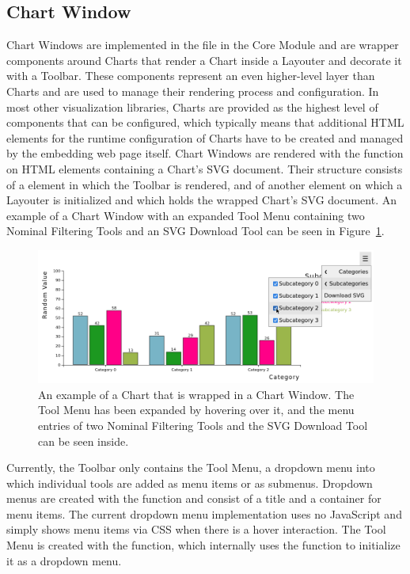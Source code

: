 \subsection{Chart Window}

Chart Windows are implemented in the  file in
the Core Module and are wrapper components around Charts that render a
Chart inside a Layouter and decorate it with a Toolbar.  These
components represent an even higher-level layer than Charts and are
used to manage their rendering process and configuration.  In most
other visualization libraries, Charts are provided as the highest
level of components that can be configured, which typically means that
additional HTML elements for the runtime configuration of Charts have
to be created and managed by the embedding web page itself.  Chart
Windows are rendered with the  function on
HTML  elements containing a Chart's SVG document.  Their
structure consists of a  element in which the Toolbar is
rendered, and of another  element on which a Layouter is
initialized and which holds the wrapped Chart's SVG document.  An
example of a Chart Window with an expanded Tool Menu containing two
Nominal Filtering Tools and an SVG Download Tool can be seen in
Figure~\ref{fig:ChartWindow}.


\begin{figure}[tp]
\centering
\includegraphics[keepaspectratio,width=\linewidth,height=\fullh]
{images/chart-window.png}
\caption[Chart Window Example]{%
An example of a Chart that is wrapped in a Chart Window.  The Tool
Menu has been expanded by hovering over it, and the menu entries of
two Nominal Filtering Tools and the SVG Download Tool can be seen
inside. 
}
\label{fig:ChartWindow}
\end{figure}


Currently, the Toolbar only contains the Tool Menu, a dropdown menu
into which individual tools are added as menu items or as submenus.
Dropdown menus are created with the  function
and consist of a title and a container for menu items.  The current
dropdown menu implementation uses no JavaScript and simply shows menu
items via CSS when there is a hover interaction.  The Tool Menu is
created with the  function, which internally
uses the  function to initialize it as a
dropdown menu.

